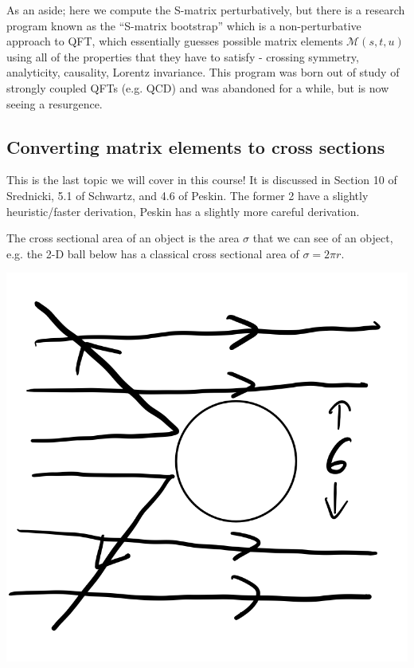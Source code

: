 As an aside; here we compute the S-matrix perturbatively, but there is a research program known as the ``S-matrix bootstrap'' which is a non-perturbative approach to QFT, which essentially guesses possible matrix elements $\mathcal{M}(s, t, u)$ using all of the properties that they have to satisfy - crossing symmetry, analyticity, causality, Lorentz invariance. This program was born out of study of strongly coupled QFTs (e.g. QCD) and was abandoned for a while, but is now seeing a resurgence.

\subsection{Converting matrix elements to cross sections}
This is the last topic we will cover in this course! It is discussed in Section 10 of Srednicki, 5.1 of Schwartz, and 4.6 of Peskin. The former 2 have a slightly heuristic/faster derivation, Peskin has a slightly more careful derivation.

The cross sectional area of an object is the area $\sigma$ that we can see of an object, e.g. the 2-D ball below has a classical cross sectional area of $\sigma = 2\pi r$. 

\begin{center}
    \includegraphics[scale=0.35]{Lectures/Figures/lec18-sigma.png}
\end{center}

